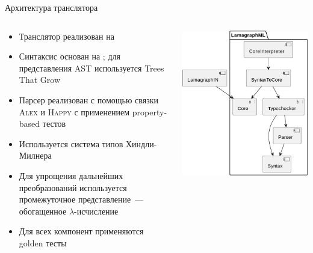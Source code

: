 \documentclass
  [ russian
  , aspectratio=169 %
  ] {beamer}
\begin{document}
\begin{frame}{Архитектура транслятора}
    \begin{columns}
        \begin{column}{0.6\textwidth}
            \begin{itemize}
                \item Транслятор реализован на \Haskell{}
                \item Синтаксис основан на \OCaml{}; для представления AST используется Trees That Grow
                \item Парсер реализован с помощью связки \textsc{Alex} и \textsc{Happy} с применением property-based тестов
                \item Используется система типов Хиндли-Милнера
                \item Для упрощения дальнейших преобразований используется промежуточное представление~--- обогащенное $\lambda$-исчисление %
                \item Для всех компонент применяются golden тесты
            \end{itemize}
        \end{column}
        \begin{column}{0.35\textwidth}
            \begin{center}
                \includegraphics[width=\linewidth]{figures/components.pdf}
            \end{center}
        \end{column}
    \end{columns}
\end{frame}
\end{document}

